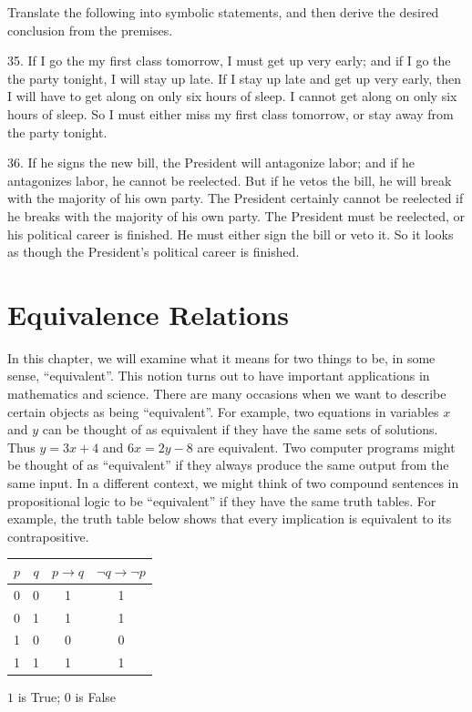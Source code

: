 \documentclass{article}
\newcommand{\0}{\mathbf 0}
\newcommand{\1}{\mathbf 1}
\begin{document}
Translate the following into symbolic statements, and then derive the desired conclusion from the premises.

\begin{description}
  \item{35.} If I go the my first class tomorrow, I must get up very early; and if I go the the party tonight, I will stay up late. If I stay up late and get up very early, then I will have to get along on only six hours of sleep. I cannot get along on only six hours of sleep. So I must either miss my first class tomorrow, or stay away from the party tonight.
  \item{36.} If he signs the new bill, the President will antagonize labor; and if he antagonizes labor, he cannot be reelected. But if he vetos the bill, he will break with the majority of his own party. The President certainly cannot be reelected if he breaks with the majority of his own party. The President must be reelected, or his political career is finished. He must either sign the bill or veto it. So it looks as though the President's political career is finished.
\end{description}




\newpage

\section{Equivalence Relations}


In this chapter, we will examine what it means for two things to be, in some sense, ``equivalent''. This notion turns out to have important applications in mathematics and science. There are many occasions when we want to describe certain objects as being ``equivalent''. For example, two equations in variables $x$ and $y$ can be thought of as equivalent if they have the same sets of solutions. Thus $y = 3x + 4$ and $6x = 2y-8$ are equivalent. Two computer programs might be thought of as ``equivalent'' if they always produce the same output from the same input. In a different context, we might think of two compound sentences in propositional logic to be ``equivalent'' if they have the same truth tables. For example, the truth table below shows that every implication is equivalent to its contrapositive.
\begin{center}
\begin{tabular}{||c|c||c|c||}
  \hline
  $p$ & $q$ & $p \to q$ & $\lnot q \to \lnot p$ \\ 
  \hline
  0 & 0 & 1 & 1 \\ 
  \hline
  0 & 1 & 1 & 1 \\ 
  \hline
  1 & 0 & 0 & 0 \\ 
  \hline
  1 & 1 & 1 & 1 \\ 
  \hline
\end{tabular}

$1$ is True; $0$ is False
\end{center}
\end{document}
